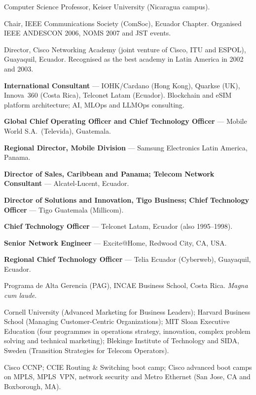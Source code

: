\begin{cvlist}
  \item[2019--present] Computer Science Professor, Keiser University
    (Nicaragua campus).
  \item[2006--2009] Chair, IEEE Communications Society (ComSoc), Ecuador
    Chapter. Organised IEEE ANDESCON 2006, NOMS 2007 and JST events.
  \item[2001--2005] Director, Cisco Networking Academy (joint venture of
    Cisco, ITU and ESPOL), Guayaquil, Ecuador. Recognised as the best
    academy in Latin America in 2002 and 2003.
\end{cvlist}

\begin{cvlist}
  \item[2019--present] \textbf{International Consultant} --- IOHK/Cardano
    (Hong Kong), Quarkse (UK), Innova~360 (Costa Rica), Telconet Latam
    (Ecuador). Blockchain and eSIM platform architecture; AI, MLOps and
    LLMOps consulting.
  \item[2014--2019] \textbf{Global Chief Operating Officer and Chief
    Technology Officer} --- Mobile World S.A.\ (Televida), Guatemala.
  \item[2013--2014] \textbf{Regional Director, Mobile Division} --- Samsung
    Electronics Latin America, Panama.
  \item[2012--2013] \textbf{Director of Sales, Caribbean and Panama;
    Telecom Network Consultant} --- Alcatel-Lucent, Ecuador.
  \item[2008--2011] \textbf{Director of Solutions and Innovation, Tigo
    Business; Chief Technology Officer} --- Tigo Guatemala (Millicom).
  \item[2001--2008] \textbf{Chief Technology Officer} --- Telconet Latam,
    Ecuador (also 1995--1998).
  \item[2001] \textbf{Senior Network Engineer} --- Excite@Home, Redwood City,
    CA, USA.
  \item[1998--1999] \textbf{Regional Chief Technology Officer} --- Telia
    Ecuador (Cyberweb), Guayaquil, Ecuador.
\end{cvlist}

\begin{cvlist}
  \item[2017--2018] Programa de Alta Gerencia (PAG), INCAE Business School,
    Costa Rica. \emph{Magna cum laude}.
  \item[Executive] Cornell University (Advanced Marketing for Business
    Leaders); Harvard Business School (Managing Customer-Centric
    Organizations); MIT Sloan Executive Education (four programmes in
    operations strategy, innovation, complex problem solving and technical
    marketing); Blekinge Institute of Technology and SIDA, Sweden
    (Transition Strategies for Telecom Operators).
  \item[Technical] Cisco CCNP; CCIE Routing \& Switching boot camp; Cisco
    advanced boot camps on MPLS, MPLS~VPN, network security and Metro
    Ethernet (San Jose, CA and Boxborough, MA).
\end{cvlist}
